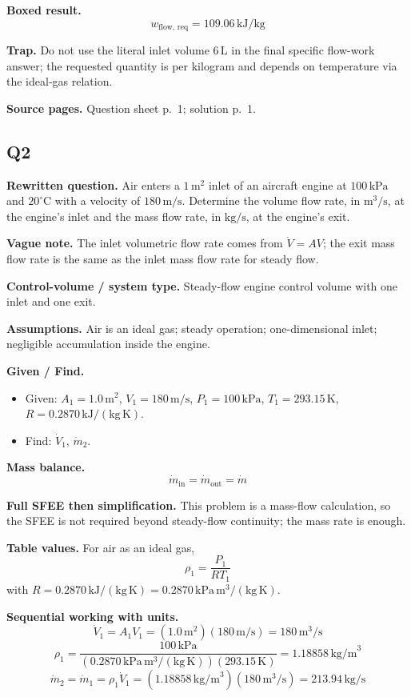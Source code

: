 \textbf{Boxed result.}
\[
\boxed{w_{\text{flow, req}} = 109.06\,\text{kJ/kg}}
\]

\textbf{Trap.} Do not use the literal inlet volume $6\,\text{L}$ in the final specific flow-work answer; the requested quantity is per kilogram and depends on temperature via the ideal-gas relation.

\textbf{Source pages.} Question sheet p.~1; solution p.~1.

\subsection*{Q2}
\textbf{Rewritten question.} Air enters a $1\,\text{m}^2$ inlet of an aircraft engine at $100\,\text{kPa}$ and $20^\circ\text{C}$ with a velocity of $180\,\text{m/s}$. Determine the volume flow rate, in $\text{m}^3/\text{s}$, at the engine's inlet and the mass flow rate, in $\text{kg/s}$, at the engine's exit.

\textbf{Vague note.} The inlet volumetric flow rate comes from $\dot V = AV$; the exit mass flow rate is the same as the inlet mass flow rate for steady flow.

\textbf{Control-volume / system type.} Steady-flow engine control volume with one inlet and one exit.

\textbf{Assumptions.} Air is an ideal gas; steady operation; one-dimensional inlet; negligible accumulation inside the engine.

\textbf{Given / Find.}
\begin{itemize}
  \item Given: $A_1=1.0\,\text{m}^2$, $V_1=180\,\text{m/s}$, $P_1=100\,\text{kPa}$, $T_1=293.15\,\text{K}$, $R=0.2870\,\mathrm{kJ/(kg\,K)}$.
  \item Find: $\dot V_1$, $\dot m_2$.
\end{itemize}

\textbf{Mass balance.}
\[
\dot m_{\text{in}}=\dot m_{\text{out}}=\dot m
\]

\textbf{Full SFEE then simplification.} This problem is a mass-flow calculation, so the SFEE is not required beyond steady-flow continuity; the mass rate is enough.

\textbf{Table values.} For air as an ideal gas,
\[
\rho_1 = \frac{P_1}{RT_1}
\]
with $R=0.2870\,\mathrm{kJ/(kg\,K)} = 0.2870\,\mathrm{kPa\,m^3/(kg\,K)}$.

\textbf{Sequential working with units.}
\[
\dot V_1 = A_1V_1 = (1.0\,\text{m}^2)(180\,\text{m/s}) = 180\,\text{m}^3/\text{s}
\]
\[
\rho_1 = \frac{100\,\text{kPa}}{(0.2870\,\mathrm{kPa\,m^3/(kg\,K)})(293.15\,\text{K})} = 1.18858\,\text{kg/m}^3
\]
\[
\dot m_2=\dot m_1=\rho_1\dot V_1=(1.18858\,\text{kg/m}^3)(180\,\text{m}^3/\text{s})=213.94\,\text{kg/s}
\]

